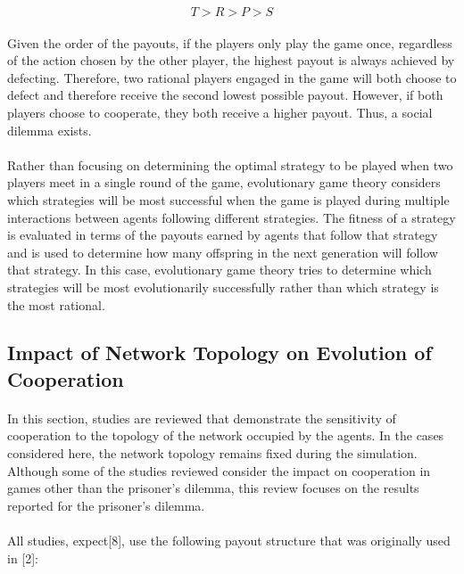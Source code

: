 \documentclass{article}
\begin{document}
    \begin{equation}
    	T > R > P > S
    \end{equation}
    
    \paragraph{}Given the order of the payouts, if the players only play the game once, regardless of the action chosen by the other player, the highest payout is always achieved by defecting.  Therefore, two rational players engaged in the game will both choose to defect and therefore receive the second lowest possible payout.  However, if both players choose to cooperate, they both receive a higher payout.  Thus, a social dilemma exists.
    \paragraph{}Rather than focusing on determining the optimal strategy to be played when two players meet in a single round of the game, evolutionary game theory considers which strategies will be most successful when the game is played during multiple interactions between agents following different strategies.  The fitness of a strategy is evaluated in terms of the payouts earned by agents that follow that strategy and is used to determine how many offspring in the next generation will follow that strategy.  In this case, evolutionary game theory tries to determine which strategies will be most evolutionarily successfully rather than which strategy is the most rational.

    \subsection{Impact of Network Topology on Evolution of Cooperation}
    \paragraph{}In this section, studies are reviewed that demonstrate the sensitivity of cooperation to the topology of the network occupied by the agents.  In the cases considered here, the network topology remains fixed during the simulation.  Although some of the studies reviewed consider the impact on cooperation in games other than the prisoner’s dilemma, this review focuses on the results reported for the prisoner’s dilemma.
    \paragraph{}All studies, expect[8], use the following payout structure that was originally used in [2]:
\end{document}
